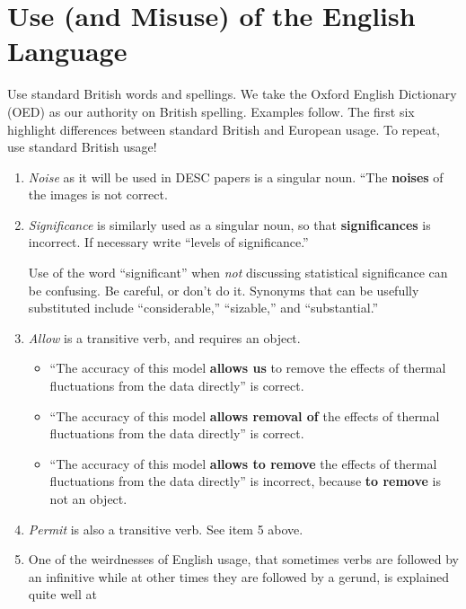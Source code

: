 \documentclass[letterpaper,11pt]{article}
\begin{document}
\section{Use (and Misuse) of the English Language}

Use standard British words and spellings.  We take the Oxford English Dictionary (OED) as our authority on British spelling.  Examples follow.  The
first six highlight differences between standard British and European usage.
To repeat, use standard British usage!

\begin{enumerate}

\item {\it Noise\/} as it will be used in DESC papers is a singular noun.  ``The {\bf noises} of
the images is not correct.

\item
 {\it Significance\/} is similarly used as a singular noun, so that
{\bf significances} is incorrect.  If necessary write ``levels of
significance.''

Use of the word ``significant'' when {\it not\/} discussing statistical
significance can be confusing.  Be careful, or don't do it.  Synonyms that
can be usefully substituted include ``considerable,'' ``sizable,'' and
``substantial.''

\item {\it Allow\/} is a transitive verb, and requires an object.

\begin{itemize}
\item``The accuracy of this model {\bf allows us} to remove the effects
of thermal fluctuations from the data directly'' is correct.

\item``The accuracy of this model {\bf allows removal of} the effects of
thermal fluctuations from the data directly'' is correct.

\item``The accuracy of this model {\bf allows to remove} the effects of
thermal fluctuations from the data directly'' is incorrect, because
{\bf to remove} is not an object.
\end{itemize}

\item {\it Permit\/} is also a transitive verb.  See item 5 above.

\item One of the weirdnesses of English usage, that sometimes verbs are
followed by an infinitive while at other times they are followed by a gerund,
is explained quite well at


\end{enumerate}
\end{document}
